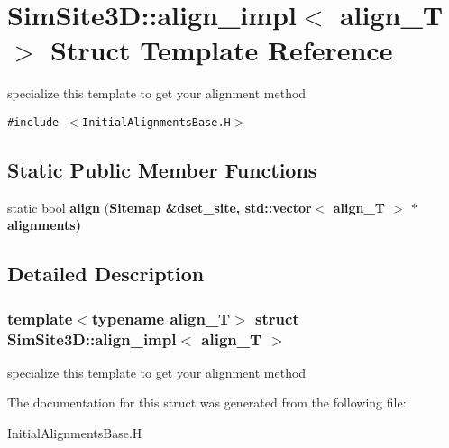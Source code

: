 \section{SimSite3D::align\_\-impl$<$ align\_\-T $>$ Struct Template Reference}
\label{structSimSite3D_1_1align__impl}
specialize this template to get your alignment method  


{\tt \#include $<$Initial\-Alignments\-Base.H$>$}

\subsection*{Static Public Member Functions}
\begin{CompactItemize}
\item 
static bool \textbf{align} (\bf{Sitemap} \&dset\_\-site, std::vector$<$ align\_\-T $>$ $\ast$alignments)\label{structSimSite3D_1_1align__impl_7a67a2011c08aa8b8888af4a9aed4c66}

\end{CompactItemize}


\subsection{Detailed Description}
\subsubsection*{template$<$typename align\_\-T$>$ struct SimSite3D::align\_\-impl$<$ align\_\-T $>$}

specialize this template to get your alignment method 



The documentation for this struct was generated from the following file:\begin{CompactItemize}
\item 
Initial\-Alignments\-Base.H\end{CompactItemize}
